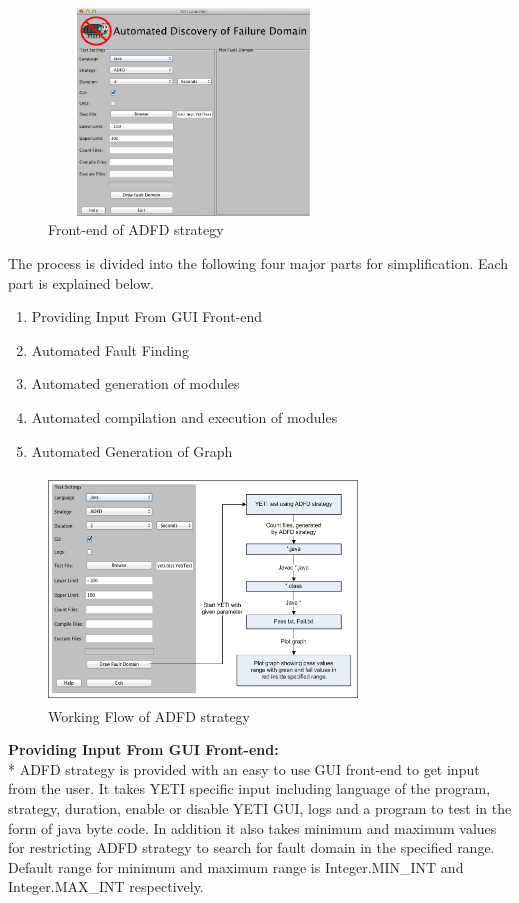 \documentclass{acm_proc_article-sp}
\begin{document}
\begin{figure}[ht]
\centering
\includegraphics[width=7.7cm,height=5.5cm]{ADFD-front-end.png}
\caption{Front-end of ADFD strategy}
\label{fig:ADFD}
\end{figure}


The process is divided into the following four major parts for simplification. Each part is explained below.

\begin{enumerate}
\item Providing Input From GUI Front-end
\item Automated Fault Finding
\item Automated generation of modules
\item Automated compilation and execution of modules
\item Automated Generation of Graph
\end{enumerate}

\begin{figure}[ht]
\centering
\includegraphics[width=8.2cm,height=6cm]{ADFD-Diagram1.png}
\caption{Working Flow of ADFD strategy}
\label{fig:ADFD}
\end{figure}

\noindent \textbf{Providing Input From GUI Front-end:}\\*
ADFD strategy is provided with an easy to use GUI front-end to get input from the user. It takes YETI specific input including language of the program, strategy, duration, enable or disable YETI GUI, logs and a program to test in the form of java byte code. In addition it also takes minimum and maximum values for restricting ADFD strategy to search for fault domain in the specified range. Default range for minimum and maximum range is Integer.MIN\_INT and Integer.MAX\_INT respectively. 
\end{document}
